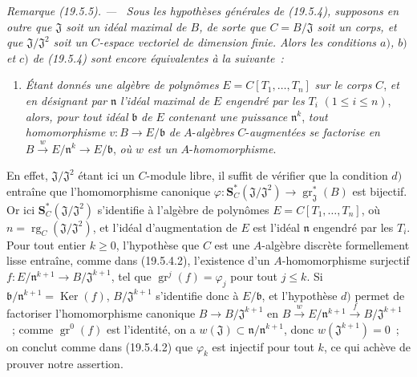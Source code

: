 \documentclass[10pt,oneside]{book}
\makeatletter
\newcommand{\gr}{\operatorname{gr}}
\newcommand{\setmanualcurrentlabel}[1]{\def\@currentlabel{#1}}
\newenvironment{remark}[1][]{%
  \setmanualcurrentlabel{#1}\par\medskip\noindent\itshape Remarque (#1). ---\ }{\par}
\makeatother
\begin{document}
\begin{remark}[19.5.5]
\label{0.19.5.5-fr}
Sous les hypothèses générales de (19.5.4), supposons en outre que
$\mathfrak J$ soit un idéal \emph{maximal} de $B$, de sorte que
$C=B/\mathfrak J$ soit un corps, et que $\mathfrak J/\mathfrak J^2$ soit un
$C$-espace vectoriel de dimension \emph{finie}. Alors les conditions $a)$,
$b)$ et $c)$ de (19.5.4) sont encore équivalentes à la suivante~:
\begin{enumerate}
  \item[d)] \emph{Étant donnés une algèbre de polynômes}
  $E=C[T_1,\ldots,T_n]$ \emph{sur le corps} $C$, \emph{et en désignant par}
  $\mathfrak n$ \emph{l'idéal maximal de} $E$ \emph{engendré par les} $T_i$
  $(1\leq i\leq n)$, \emph{alors, pour tout idéal} $\mathfrak b$ \emph{de}
  $E$ \emph{contenant une puissance} $\mathfrak n^k$, \emph{tout
  homomorphisme} $v:B\to E/\mathfrak b$ \emph{de} $A$-\emph{algèbres}
  $C$-\emph{augmentées se factorise en}
  $B\xrightarrow{w}E/\mathfrak n^k\to E/\mathfrak b$, \emph{où} $w$ \emph{est
  un} $A$-\emph{homomorphisme}.
\end{enumerate}
En effet, $\mathfrak J/\mathfrak J^2$ étant ici un $C$-module libre, il suffit
de vérifier que la condition $d)$ entraîne que l'homomorphisme canonique
$\varphi:\mathbf S_C^*(\mathfrak J/\mathfrak J^2)\to\gr_{\mathfrak J}^*(B)$
est bijectif. Or ici $\mathbf S_C^*(\mathfrak J/\mathfrak J^2)$ s'identifie à
l'algèbre de polynômes $E=C[T_1,\ldots,T_n]$, où
$n=\operatorname{rg}_C(\mathfrak J/\mathfrak J^2)$, et l'idéal d'augmentation
de $E$ est l'idéal $\mathfrak n$ engendré par les $T_i$. Pour tout entier
$k\geq0$, l'hypothèse que $C$ est une $A$-algèbre discrète formellement lisse
entraîne, comme dans (19.5.4.2), l'existence d'un $A$-homomorphisme surjectif
$f:E/\mathfrak n^{k+1}\to B/\mathfrak J^{k+1}$, tel que
$\gr^j(f)=\varphi_j$ pour tout $j\leq k$. Si
$\mathfrak b/\mathfrak n^{k+1}=\operatorname{Ker}(f)$,
$B/\mathfrak J^{k+1}$ s'identifie donc à $E/\mathfrak b$, et l'hypothèse $d)$
permet de factoriser l'homomorphisme canonique $B\to B/\mathfrak J^{k+1}$ en
$B\xrightarrow{w}E/\mathfrak n^{k+1}\xrightarrow{f}B/\mathfrak J^{k+1}$~;
comme $\gr^0(f)$ est l'identité, on a
$w(\mathfrak J)\subset\mathfrak n/\mathfrak n^{k+1}$, donc
$w(\mathfrak J^{k+1})=0$~; on conclut comme dans (19.5.4.2) que $\varphi_k$
est injectif pour tout $k$, ce qui achève de prouver notre assertion.
\end{remark}
\end{document}
